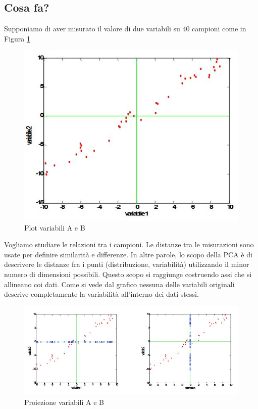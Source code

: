 \documentclass[12pt]{article}
\begin{document}
	\subsection{Cosa fa?}
		Supponiamo di aver misurato il valore di due variabili su 40 campioni come in Figura \ref{fig:plot1} 
		\begin{figure}[H]
			\begin{center}
				\includegraphics[scale=.5]{plotTeoria}
				\caption{Plot variabili A e B}
				\label{fig:plot1}
			\end{center}
		\end{figure}
		Vogliamo studiare le relazioni tra i campioni. Le distanze tra le misurazioni sono usate per definire similarità e differenze. In altre parole, lo scopo della \ac{PCA} è di descrivere le distanze fra i punti (distribuzione, variabilità) utilizzando il minor numero di dimensioni possibili. Questo scopo si raggiunge costruendo assi che si allineano coi dati. Come si vede dal grafico nessuna delle variabili originali descrive completamente la variabilità all’interno dei dati stessi. 
		\begin{figure}[H]
			\begin{center}
				\includegraphics[scale=.6]{proiezione}
				\caption{Proiezione variabili A e B}
				\label{fig:proiezione}
			\end{center}
		\end{figure}
\end{document}
